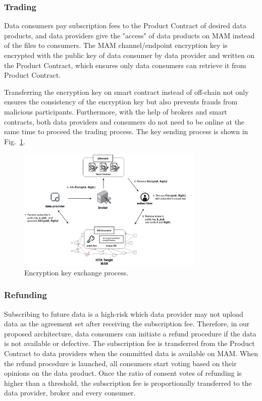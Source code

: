 \documentclass[conference]{IEEEtran}
\begin{document}
\subsubsection{Trading}
Data consumers pay subscription fees to the Product Contract of desired data products, and data providers give the "access" of data products on MAM instead of the files to consumers. The MAM channel/endpoint encryption key is encrypted with the public key of data consumer by data provider and written on the Product Contract, which ensures only data consumers can retrieve it from Product Contract.

Transferring the encryption key on smart contract instead of off-chain not only ensures the consistency of the encryption key but also prevents frauds from malicious participants. Furthermore, with the help of brokers and smart contracts, both data providers and consumers do not need to be online at the same time to proceed the trading process. The key sending process is shown in Fig.~\ref{fig:key_exchange}. 

\begin{figure}[!t]
    \centering
    \includegraphics[width=3.5in]{key_exchange}
    \caption{Encryption key exchange process.}
    \label{fig:key_exchange}
\end{figure}

\subsubsection{Refunding}
Subscribing to future data is a high-risk which data provider may not upload data as the agreement set after receiving the subscription fee. Therefore, in our proposed architecture, data consumers can initiate a refund procedure if the data is not available or defective. The subscription fee is transferred from the Product Contract to data providers when the committed data is available on MAM. When the refund procedure is launched, all consumers start voting based on their opinions on the data product. Once the ratio of consent votes of refunding is higher than a threshold, the subscription fee is proportionally transferred to the data provider, broker and every consumer.
\end{document}

